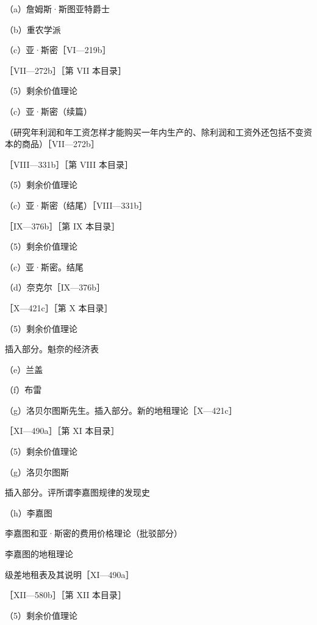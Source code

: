 \indentpara{4em}（a）詹姆斯·斯图亚特爵士

\indentpara{4em}（b）重农学派

\indentpara{4em}（c）亚·斯密［VI—219b］

\indentpara{0em}［VII—272b］［第 VII 本目录］

\indentpara{2em}（5）剩余价值理论

\indentpara{4em}（c）亚·斯密（续篇）

\indentpara{6em}（研究年利润和年工资怎样才能购买一年内生产的、除利润和工资外还包括不变资本的商品）［VII—272b］

\indentpara{0em}［VIII—331b］［第 VIII 本目录］

\indentpara{2em}（5）剩余价值理论

\indentpara{4em}（c）亚·斯密（结尾）［VIII—331b］

\indentpara{0em}［IX—376b］［第 IX 本目录］

\indentpara{2em}（5）剩余价值理论

\indentpara{4em}（c）亚·斯密。结尾

\indentpara{4em}（d）奈克尔［IX—376b］

\indentpara{0em}［X—421c］［第 X 本目录］

\indentpara{2em}（5）剩余价值理论

\indentpara{6em}插入部分。魁奈的经济表

\indentpara{4em}（e）兰盖

\indentpara{4em}（f）布雷

\indentpara{4em}（g）洛贝尔图斯先生。插入部分。新的地租理论［X—421c］

\indentpara{0em}［XI—490a］［第 XI 本目录］

\indentpara{2em}（5）剩余价值理论

\indentpara{4em}（g）洛贝尔图斯

\indentpara{6em}插入部分。评所谓李嘉图规律的发现史

\indentpara{4em}（h）李嘉图

\indentpara{6em}李嘉图和亚·斯密的费用价格理论（批驳部分）

\indentpara{6em}李嘉图的地租理论

\indentpara{6em}级差地租表及其说明［XI—490a］

\indentpara{0em}［XII—580b］［第 XII 本目录］

\indentpara{2em}（5）剩余价值理论

